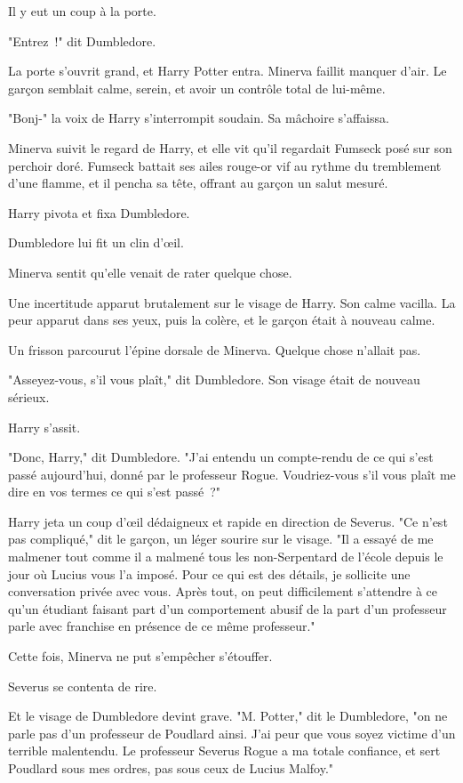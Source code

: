 Il y eut un coup à la porte.

"Entrez~!" dit Dumbledore.

La porte s'ouvrit grand, et Harry Potter entra. Minerva faillit manquer d'air. Le garçon semblait calme, serein, et avoir un contrôle total de lui-même.

"Bonj-" la voix de Harry s'interrompit soudain. Sa mâchoire s'affaissa.

Minerva suivit le regard de Harry, et elle vit qu'il regardait Fumseck posé sur son perchoir doré. Fumseck battait ses ailes rouge-or vif au rythme du tremblement d'une flamme, et il pencha sa tête, offrant au garçon un salut mesuré.

Harry pivota et fixa Dumbledore.

Dumbledore lui fit un clin d'œil.

Minerva sentit qu'elle venait de rater quelque chose.

Une incertitude apparut brutalement sur le visage de Harry. Son calme vacilla. La peur apparut dans ses yeux, puis la colère, et le garçon était à nouveau calme.

Un frisson parcourut l'épine dorsale de Minerva. Quelque chose n'allait pas.

"Asseyez-vous, s'il vous plaît," dit Dumbledore. Son visage était de nouveau sérieux.

Harry s'assit.

"Donc, Harry," dit Dumbledore. "J'ai entendu un compte-rendu de ce qui s'est passé aujourd'hui, donné par le professeur Rogue. Voudriez-vous s'il vous plaît me dire en vos termes ce qui s'est passé~?"

Harry jeta un coup d'œil dédaigneux et rapide en direction de Severus. "Ce n'est pas compliqué," dit le garçon, un léger sourire sur le visage. "Il a essayé de me malmener tout comme il a malmené tous les non-Serpentard de l'école depuis le jour où Lucius vous l'a imposé. Pour ce qui est des détails, je sollicite une conversation privée avec vous. Après tout, on peut difficilement s'attendre à ce qu'un étudiant faisant part d'un comportement abusif de la part d'un professeur parle avec franchise en présence de ce même professeur."

Cette fois, Minerva ne put s'empêcher s'étouffer.

Severus se contenta de rire.

Et le visage de Dumbledore devint grave. "M. Potter," dit le Dumbledore, "on ne parle pas d'un professeur de Poudlard ainsi. J'ai peur que vous soyez victime d'un terrible malentendu. Le professeur Severus Rogue a ma totale confiance, et sert Poudlard sous mes ordres, pas sous ceux de Lucius Malfoy."

